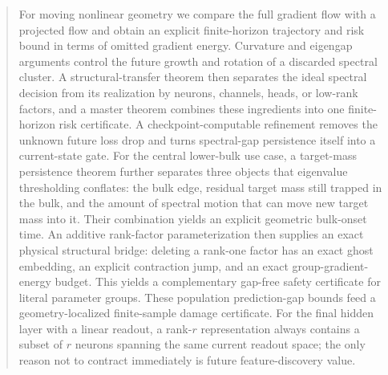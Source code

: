 \documentclass[11pt]{article}
\theoremstyle{definition}
\begin{document}
\begin{abstract}
For moving nonlinear geometry we compare the full gradient flow with a projected flow and obtain an explicit finite-horizon trajectory and risk bound in terms of omitted gradient energy. Curvature and eigengap arguments control the future growth and rotation of a discarded spectral cluster. A structural-transfer theorem then separates the ideal spectral decision from its realization by neurons, channels, heads, or low-rank factors, and a master theorem combines these ingredients into one finite-horizon risk certificate. A checkpoint-computable refinement removes the unknown future loss drop and turns spectral-gap persistence itself into a current-state gate. For the central lower-bulk use case, a target-mass persistence theorem further separates three objects that eigenvalue thresholding conflates: the bulk edge, residual target mass still trapped in the bulk, and the amount of spectral motion that can move new target mass into it. Their combination yields an explicit geometric bulk-onset time. An additive rank-factor parameterization then supplies an exact physical structural bridge: deleting a rank-one factor has an exact ghost embedding, an explicit contraction jump, and an exact group-gradient-energy budget. This yields a complementary gap-free safety certificate for literal parameter groups. These population prediction-gap bounds feed a geometry-localized finite-sample damage certificate. For the final hidden layer with a linear readout, a rank-$r$ representation always contains a subset of $r$ neurons spanning the same current readout space; the only reason not to contract immediately is future feature-discovery value.


\end{abstract}
\end{document}
